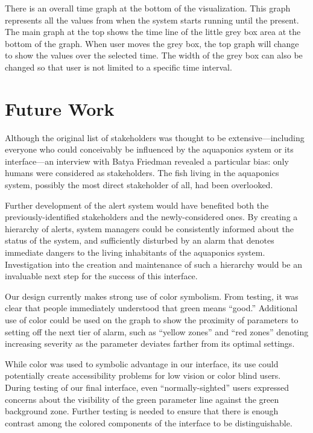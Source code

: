 \documentclass{sigchi}
\begin{document}
There is an overall time graph at the bottom of the visualization. This graph represents all the values from when the system starts running until the present. The main graph at the top shows the time line of the little grey box area at the bottom of the graph. When user moves the grey box, the top graph will change to show the values over the selected time. The width of the grey box can also be changed so that user is not limited to a specific time interval. 

\section{Future Work}
Although the original list of stakeholders was thought to be extensive---including everyone who could conceivably be influenced by the aquaponics system or its interface---an interview with Batya Friedman revealed a particular bias: only humans were considered as stakeholders. The fish living in the aquaponics system, possibly the most direct stakeholder of all, had been overlooked. 

Further development of the alert system would have benefited both the previously-identified stakeholders and the newly-considered ones. By creating a hierarchy of alerts, system managers could be consistently informed about the status of the system, and sufficiently disturbed by an alarm that denotes immediate dangers to the living inhabitants of the aquaponics system. Investigation into the creation and maintenance of such a hierarchy would be an invaluable next step for the success of this interface. 

Our design currently makes strong use of color symbolism. From testing, it was clear that people immediately understood that green means ``good.'' Additional use of color could be used on the graph to show the proximity of parameters to setting off the next tier of alarm, such as ``yellow zones'' and ``red zones'' denoting increasing severity as the parameter deviates farther from its optimal settings.

While color was used to symbolic advantage in our interface, its use could potentially create accessibility problems for low vision or color blind users. During testing of our final interface, even ``normally-sighted'' users expressed concerns about the visibility of the green parameter line against the green background zone. Further testing is needed to ensure that there is enough contrast among the colored components of the interface to be distinguishable. 
\end{document}
